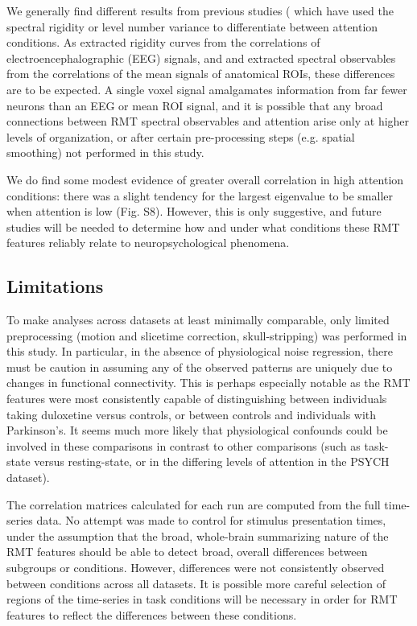 We generally find different results from previous studies
(\cite{sebaRandomMatrixAnalysis2003,wangRandomMatrixTheory2016,matharooSpontaneousBackpainAlters2020}
which have used the spectral rigidity or level number variance to differentiate between attention
conditions. As \cite{sebaRandomMatrixAnalysis2003} extracted rigidity curves from the correlations
of electroencephalographic (EEG) signals, and \cite{wangRandomMatrixTheory2016} and
\cite{matharooSpontaneousBackpainAlters2020} extracted spectral observables from the correlations of
the mean signals of anatomical ROIs, these differences are to be expected. A single voxel signal
amalgamates information from far fewer neurons than an EEG or mean ROI signal, and it is possible
that any broad connections between RMT spectral observables and attention arise only at higher
levels of organization, or after certain pre-processing steps (e.g. spatial smoothing) not performed
in this study.

We do find some modest evidence of greater overall correlation in high attention conditions: there
was a slight tendency for the largest eigenvalue to be smaller when attention is low (Fig. S8).
However, this is only suggestive, and future studies will be needed to determine how and under what
conditions these RMT features reliably relate to neuropsychological phenomena.

\subsection{Limitations}

To make analyses across datasets at least minimally comparable, only limited preprocessing (motion
and slicetime correction, skull-stripping) was performed in this study. In particular, in the
absence of physiological noise regression, there must be caution in assuming any of the observed
patterns are uniquely due to changes in functional connectivity. This is perhaps especially notable
as the RMT features were most consistently capable of distinguishing between individuals taking
duloxetine versus controls, or between controls and individuals with Parkinson's. It seems much more
likely that physiological confounds could be involved in these comparisons in contrast to other
comparisons (such as task-state versus resting-state, or in the differing levels of attention in the
PSYCH dataset).

The correlation matrices calculated for each run are computed from the full time-series data. No
attempt was made to control for stimulus presentation times, under the assumption that the broad,
whole-brain summarizing nature of the RMT features should be able to detect broad, overall
differences between subgroups or conditions. However, differences were not consistently observed
between conditions across all datasets. It is possible more careful selection of regions of the
time-series in task conditions will be necessary in order for RMT features to reflect the
differences between these conditions.

